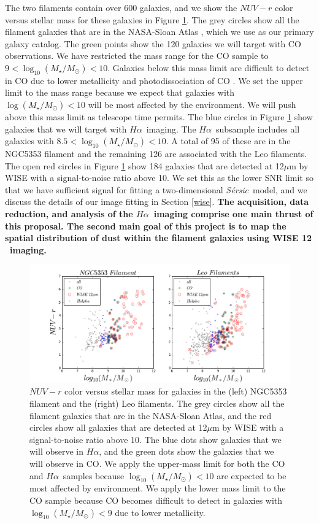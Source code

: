 \documentclass[11pt, preprint]{aastex}
\newcommand{\ha}{$H\alpha$}
\newcommand{\sers}{{\it S\'{e}rsic}}
\begin{document}
The two filaments contain over 600 galaxies, and we show the $NUV-r$
color versus stellar mass for these galaxies in Figure \ref{sample}.
The grey circles show all the filament galaxies that are in the
NASA-Sloan Atlas \citep{blanton05}, which we use as our primary galaxy
catalog.  The green points show the 120 galaxies 
we will target with CO observations.  We have restricted the mass
range for the CO sample to $9 < \log_{10} (M_\star/M_\odot) < 10$.
Galaxies below this mass limit are difficult to detect in CO due
to lower metallicity and photodissociation of CO \citep[e.g.][]{cormier14}.  We set the
upper limit to the mass range because we expect that galaxies with
$\log (M_\star/M_\odot) < 10$ will be most affected by the
environment.  We will push above this mass limit as telescope time
permits.
The blue circles in Figure \ref{sample} show galaxies that we will
target with \ha \ imaging.   The \ha \ subsample includes all galaxies
with $8.5 < \log_{10} (M_\star/M_\odot) < 10$.  A total of 95 of these
are in the NGC5353 filament and the remaining 126 are associated with
the Leo filaments. 
The open red circles in Figure \ref{sample} show 184 galaxies that are
detected at 12$\mu$m by WISE with a signal-to-noise ratio above 10.
We set this as the lower SNR limit so that we have sufficient signal for
fitting a two-dimensional \sers \ model, and we discuss the details of
our image fitting in Section \ref{wise}.
{\bf  The acquisition, data reduction, and analysis of
the \ha \ imaging comprise one main thrust of this proposal.
The second main goal of this project is to map the spatial
distribution of dust within the filament galaxies using WISE 12\micron
\ imaging.  }


\begin{figure}[h]
\includegraphics[width=\textwidth]{sample.png}
\caption{\small $NUV-r$ color versus stellar mass for galaxies 
  in the (left) NGC5353 filament and the (right) Leo filaments.
The grey circles show all the filament galaxies that are in the
NASA-Sloan Atlas, and the red circles show all galaxies that are
detected at 12$\mu$m by WISE with a signal-to-noise ratio above 10.
The blue dots show galaxies that we will observe in \ha, and the green
dots show the galaxies that we will observe in CO.  We apply the upper-mass
limit for both the CO and \ha \ samples because
$\log_{10}(M_\star/M_\odot) < 10$ are expected to be most affected by
environment.  We apply the lower mass limit to the CO sample because
CO becomes difficult to detect in galaxies with
$\log_{10}(M_\star/M_\odot) < 9$ due to lower metallicity.}
\label{sample}
\end{figure}
\end{document}
